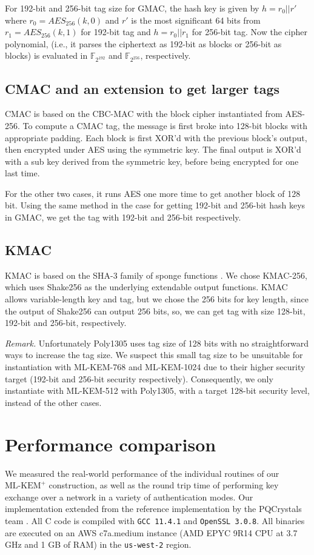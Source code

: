 \documentclass[journal=tches,submission]{iacrtrans}
\def\mlkemplus{\text{ML-KEM}^+}
\begin{document}
For 192-bit and 256-bit tag size for GMAC, the hash key is given by $h=r_0 || r'$ where $r_0=AES_{256}(k, 0)$  and $r'$ is the most significant 64 bits from $r_1=AES_{256}(k, 1)$ for 192-bit tag and $h=r_0||r_1$ for 256-bit tag.  Now the cipher polynomial, (i.e., it parses the ciphertext  as 192-bit as  blocks or 256-bit as  blocks)  is  evaluated in $\mathbb{F}_{2^{192}}$ and $\mathbb{F}_{2^{256}}$, respectively. 

\subsection{CMAC and an extension to get larger tags}
CMAC is based on the CBC-MAC with the block cipher instantiated from AES-256. To compute a CMAC tag, the message is first broke into 128-bit blocks with appropriate padding. Each block is first XOR'd with the previous block's output, then encrypted under AES using the symmetric key. The final output is XOR'd with a sub key derived from the symmetric key, before being encrypted for one last time.

For the other two cases, it runs AES one more time to get another block of 128 bit.  Using  the same method in the case for getting  192-bit and 256-bit hash keys in GMAC,  we get the tag with  192-bit and 256-bit respectively. 


\subsection{KMAC}
KMAC is based on the SHA-3 family of sponge functions \cite{FIPS202}. We chose KMAC-256, which uses Shake256 as the underlying extendable output functions. KMAC allows variable-length key and tag, but we chose the 256 bits for key length, since the output of Shake256 can output 256 bits, so, we can get tag with size 128-bit, 192-bit and 256-bit, respectively.  


\emph{Remark.} Unfortunately Poly1305 uses tag size of 128 bits with no straightforward ways to increase the tag size.  We suspect this small tag size to be unsuitable for instantiation with ML-KEM-768 and ML-KEM-1024 due to their higher security target (192-bit and 256-bit security respectively). Consequently, we only instantiate  with ML-KEM-512 with Poly1305, with a target 128-bit security level, instead of the other cases. 

\section{Performance comparison}\label{sec:performance-comparison}
We measured the real-world performance of the individual routines of our $\mlkemplus$ construction, as well as the round trip time of performing key exchange over a network in a variety of authentication modes. Our implementation extended from the reference implementation by the PQCrystals team \cite{kyberrefimpl}. All C code is compiled with \texttt{GCC 11.4.1} and \texttt{OpenSSL 3.0.8}. All binaries are executed on an AWS c7a.medium instance (AMD EPYC 9R14 CPU at 3.7 GHz and 1 GB of RAM) in the \texttt{us-west-2} region.
\end{document}
